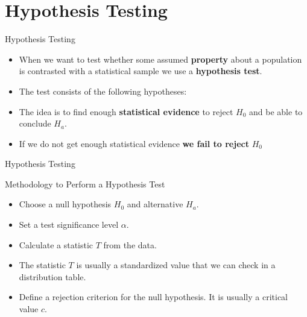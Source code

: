 \documentclass[handout]{beamer}
\begin{document}
\section{Hypothesis Testing}

\begin{frame}{Hypothesis Testing}
\scriptsize{
\begin{itemize}
 \item When we want to test whether some assumed \textbf{property} about a population is contrasted with a statistical sample we use a \textbf{hypothesis test}.
\item The test consists of the following hypotheses:
\item The idea is to find enough \textbf{statistical evidence} to reject $H_{0}$ and be able to conclude $H_{a}$.
\item If we do not get enough statistical evidence \textbf{we fail to reject} $H_{0}$

\end{itemize}



} 
\end{frame}



\begin{frame}{Hypothesis Testing}
\scriptsize{

\begin{block}{Methodology to Perform a Hypothesis Test}
\begin{itemize}
 \item Choose a null hypothesis $H_0$ and alternative $H_a$.
 \item Set a test significance level $\alpha$.
 \item Calculate a statistic $T$ from the data.
 \item  The statistic $T$ is usually a standardized value that we can check in a distribution table.
 \item Define a rejection criterion for the null hypothesis. It is usually a critical value $c$.
\end{itemize}
\end{block}



} 
\end{frame}
\end{document}
